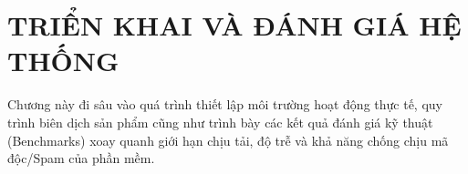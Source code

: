 \chapter{TRIỂN KHAI VÀ ĐÁNH GIÁ HỆ THỐNG}

Chương này đi sâu vào quá trình thiết lập môi trường hoạt động thực tế, quy trình biên dịch sản phẩm cũng như trình bày các kết quả đánh giá kỹ thuật (Benchmarks) xoay quanh giới hạn chịu tải, độ trễ và khả năng chống chịu mã độc/Spam của phần mềm.




